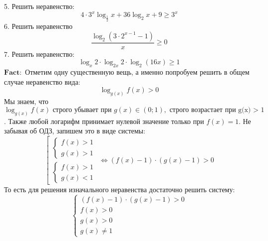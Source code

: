 \documentclass{article}
\begin{document}
5. Решить неравенство:
\[ 4 \cdot 3^x \log_{\frac{1}{2}} x + 36 \log_2 x + 9 \geq 3^x \]
6. Решить неравенство
\[ \frac{\log_2 (3\cdot2^{x - 1} - 1)}{x} \geq 0 \]
7. Решить неравенство:
\[ \log_x 2 \cdot \log_{2x} 2 \cdot \log_{2} (16x) \geq 1 \]
\(\mathbf{Fact:}\) Отметим одну существенную вещь, а именно попробуем решить в общем
случае неравенство вида:
\[ \log_{g(x)} f(x) > 0 \]
Мы знаем, что \( \log_{g(x)} f(x) \text{ строго убывает  при } g(x) \in (0;1),  
\text{ строго возрастает при g(x) > 1 }\). Также любой логарифм принимает
нулевой значение только при $f(x) = 1$. Не забывая об ОДЗ, запишем это
в виде системы:
\begin{equation*}
    \left[
    \begin{gathered}
    \begin{cases}
    f(x) > 1 \\
    g(x) > 1
    \end{cases}
    \\
    \begin{cases}
    f(x) > 1 \\
    g(x) < 1
    \end{cases}
    \end{gathered}
    \right.
    \Leftrightarrow
    (f(x) - 1) \cdot (g(x) - 1) > 0
\end{equation*}
То есть для решения изначального неравенства достаточно решить систему:
\begin{equation*}
    \begin{cases}
    (f(x) - 1) \cdot (g(x) - 1) > 0 \\
    f(x) > 0 \\
    g(x) > 0 \\
    g(x) \neq 1
    \end{cases}
\end{equation*}
\end{document}
